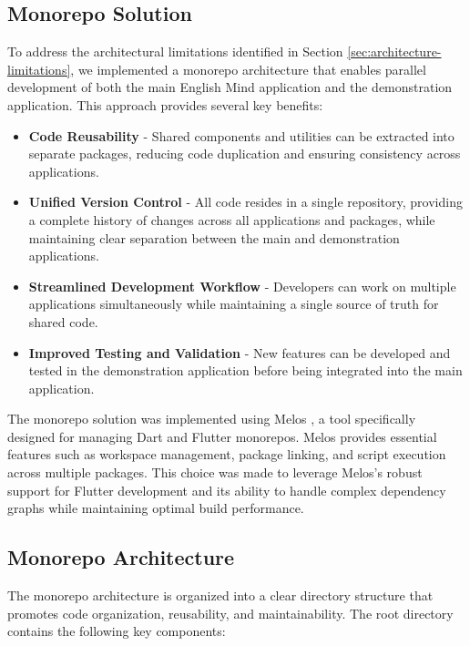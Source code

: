 \subsection{Monorepo Solution}

To address the architectural limitations identified in Section \ref{sec:architecture-limitations}, we implemented a monorepo architecture that enables parallel development of both the main English Mind application and the demonstration application. This approach provides several key benefits:

\begin{itemize}
    \item \textbf{Code Reusability} - Shared components and utilities can be extracted into separate packages, reducing code duplication and ensuring consistency across applications.
    \item \textbf{Unified Version Control} - All code resides in a single repository, providing a complete history of changes across all applications and packages, while maintaining clear separation between the main and demonstration applications.
    \item \textbf{Streamlined Development Workflow} - Developers can work on multiple applications simultaneously while maintaining a single source of truth for shared code.
    \item \textbf{Improved Testing and Validation} - New features can be developed and tested in the demonstration application before being integrated into the main application.
\end{itemize}

The monorepo solution was implemented using Melos \cite{cite:melos}, a tool specifically designed for managing Dart and Flutter monorepos. Melos provides essential features such as workspace management, package linking, and script execution across multiple packages. This choice was made to leverage Melos's robust support for Flutter development and its ability to handle complex dependency graphs while maintaining optimal build performance.

\subsection{Monorepo Architecture}

The monorepo architecture is organized into a clear directory structure that promotes code organization, reusability, and maintainability. The root directory contains the following key components:

